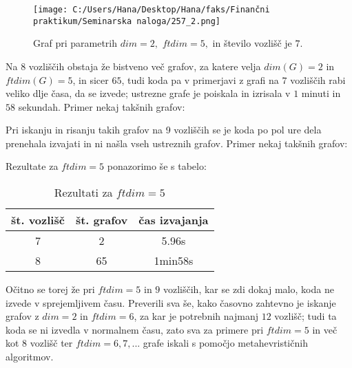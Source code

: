 \documentclass[12pt]{article}
\begin{document}
\begin{figure}[h]
    \centering
    \texttt{[image: C:/Users/Hana/Desktop/Hana/faks/Finančni praktikum/Seminarska naloga/257\_2.png]}
    \caption{Graf pri parametrih $dim = 2,$ $ftdim = 5,$ in število vozlišč je $7.$}
    \label{fig:slika257_2}
\end{figure}


Na $8$ vozliščih obstaja že bistveno več grafov, za katere velja $dim(G) = 2$ in $ftdim(G) = 5$, in sicer $65$, tudi koda pa v primerjavi z grafi na $7$ vozliščih rabi veliko dlje časa, da se izvede; ustrezne grafe je poiskala in izrisala v $1$ minuti in $58$ sekundah. Primer nekaj takšnih grafov: 


Pri iskanju in risanju takih grafov na 9 vozliščih se je koda po pol ure dela prenehala izvajati in ni našla vseh ustreznih grafov. Primer nekaj takšnih grafov:


Rezultate za $ftdim = 5$ ponazorimo še s tabelo:

\begin{table}[H] %
 \centering 
 \begin{tabular}{|c|c|c|} 
 \hline 
 \textbf{št. vozlišč} & \textbf{št. grafov} & \textbf{čas izvajanja} \\
 \hline 7 & 2 & 5.96s  \\ 
 \hline 8 & 65 & 1min58s \\
 \hline 
 \end{tabular} 
 \caption{Rezultati za $ftdim = 5$}
 \label{tab:osebe}
\end{table}



Očitno se torej že pri $ftdim = 5$ in $9$ vozliščih, kar se zdi dokaj malo, koda ne izvede v sprejemljivem času. Preverili sva še, kako časovno zahtevno je iskanje grafov z $dim = 2$ in $ftdim = 6$, za kar je potrebnih najmanj $12$ vozlišč; tudi ta koda se ni izvedla v normalnem času, zato sva za primere pri $ftdim = 5$ in več kot $8$ vozlišč ter $ftdim = 6, 7, ...$ grafe iskali s pomočjo metahevrističnih algoritmov. 
\end{document}
